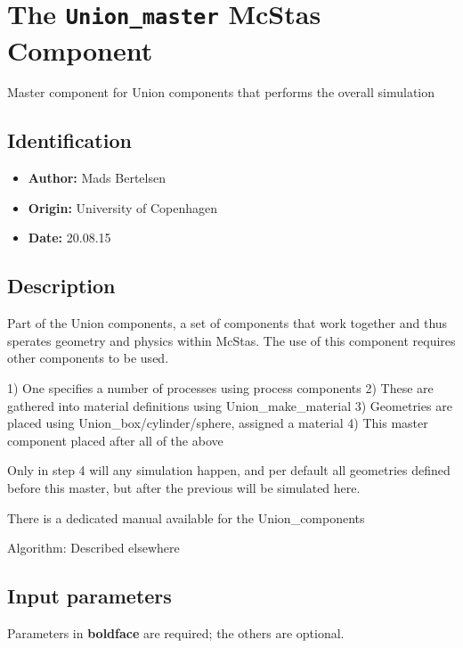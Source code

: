 \section{The \texttt{Union\_master} McStas Component}
Master component for Union components that performs the overall simulation

\subsection*{Identification}
\begin{itemize}
  \item \textbf{Author:} Mads Bertelsen
  \item \textbf{Origin:} University of Copenhagen
  \item \textbf{Date:} 20.08.15
\end{itemize}

\subsection*{Description}
Part of the Union components, a set of components that work together and thus sperates geometry and physics within McStas. The use of this component requires other components to be used.

1) One specifies a number of processes using process components 2) These are gathered into material definitions using Union\_make\_material 3) Geometries are placed using Union\_box/cylinder/sphere, assigned a material 4) This master component placed after all of the above

Only in step 4 will any simulation happen, and per default all geometries defined before this master, but after the previous will be simulated here.

There is a dedicated manual available for the Union\_components

Algorithm: Described elsewhere

\subsection*{Input parameters}
Parameters in \textbf{boldface} are required; the others are optional.


